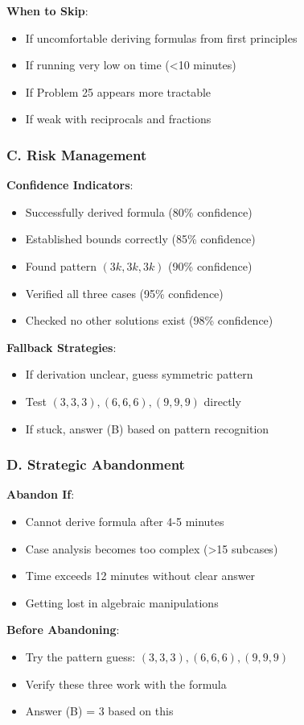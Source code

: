 \documentclass[12pt]{article}
\begin{document}
\begin{competitionbox}
\textbf{When to Skip}:
\begin{itemize}
    \item If uncomfortable deriving formulas from first principles
    \item If running very low on time (<10 minutes)
    \item If Problem 25 appears more tractable
    \item If weak with reciprocals and fractions
\end{itemize}

\subsubsection*{C. Risk Management}

\textbf{Confidence Indicators}:
\begin{itemize}
    \item Successfully derived formula (80\% confidence)
    \item Established bounds correctly (85\% confidence)
    \item Found pattern $(3k, 3k, 3k)$ (90\% confidence)
    \item Verified all three cases (95\% confidence)
    \item Checked no other solutions exist (98\% confidence)
\end{itemize}

\textbf{Fallback Strategies}:
\begin{itemize}
    \item If derivation unclear, guess symmetric pattern
    \item Test $(3,3,3), (6,6,6), (9,9,9)$ directly
    \item If stuck, answer (B) based on pattern recognition
\end{itemize}

\subsubsection*{D. Strategic Abandonment}

\textbf{Abandon If}:
\begin{itemize}
    \item Cannot derive formula after 4-5 minutes
    \item Case analysis becomes too complex (>15 subcases)
    \item Time exceeds 12 minutes without clear answer
    \item Getting lost in algebraic manipulations
\end{itemize}

\textbf{Before Abandoning}:
\begin{itemize}
    \item Try the pattern guess: $(3,3,3), (6,6,6), (9,9,9)$
    \item Verify these three work with the formula
    \item Answer (B) = 3 based on this
\end{itemize}

\end{competitionbox}
\end{document}
